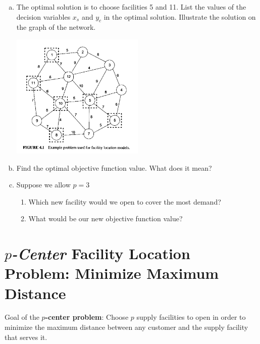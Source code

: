 \documentclass[11pt]{article}
\theoremstyle{definition}
\begin{document}
\begin{enumerate}[(a)]
\item The optimal solution is to choose facilities 5 and 11.  List the values of the decision variables $x_s$ and $y_c$ in the optimal solution.  Illustrate the solution on the graph of the network.

\hfill \includegraphics[width = 0.5\textwidth]{facloc}

\item Find the optimal objective function value.  What does it mean? \vspace{2cm}
	

\item Suppose we allow $p = 3$
\begin{enumerate}[i]
\item Which new facility would we open to cover the most demand?

\vfill 
\item What would be our new objective function value?

\vfill 


\end{enumerate}
\end{enumerate}

\newpage

\section{\emph{$p$-Center} Facility Location Problem:  Minimize Maximum Distance}

Goal of the \textbf{$p$-center problem}: Choose $p$ supply facilities to open in order to minimize the maximum distance between any customer and the supply facility that serves it.
\end{document}
